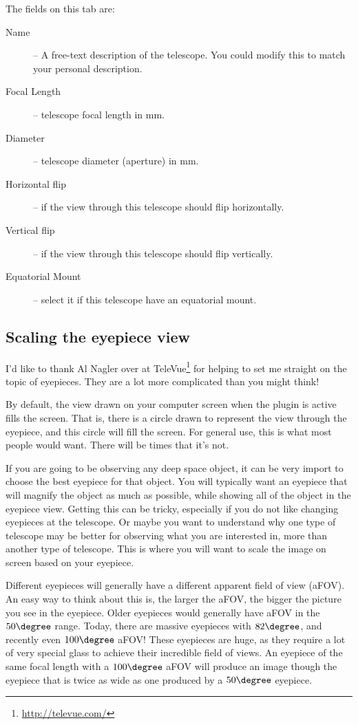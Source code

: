 The fields on this tab are:
\begin{description}
\item[Name] -- A free-text description of the telescope. You could modify this to match your personal description.
\item[Focal Length] -- telescope focal length in mm.
\item[Diameter] -- telescope diameter (aperture) in mm.
\item[Horizontal flip] -- if the view through this telescope should flip horizontally.
\item[Vertical flip] -- if the view through this telescope should flip vertically.
\item[Equatorial Mount] -- select it if this telescope have an equatorial mount.
\end{description}

\subsection{Scaling the eyepiece view}
\label{sec:sec:plugins:Oculars:ScalingTheEyepieceView}
I'd like to thank Al Nagler over at TeleVue\footnote{\url{http://televue.com/}} for helping to set me straight on the topic of eyepieces. They are a lot more complicated than you might think!

By default, the view drawn on your computer screen when the plugin is active fills the screen. That is, there is a circle drawn to represent the view through the eyepiece, and this circle will fill the screen. For general use, this is what most people would want. There will be times that it's not.

If you are going to be observing any deep space object, it can be very import to choose the best eyepiece for that object. You will typically want an eyepiece that will magnify the object as much as possible, while showing all of the object in the eyepiece view. Getting this can be tricky, especially if you do not like changing eyepieces at the telescope. Or maybe you want to understand why one type of telescope may be better for observing what you are interested in, more than another type of telescope. This is where you will want to scale the image on screen based on your eyepiece.

Different eyepieces will generally have a different apparent field of view (aFOV). An easy way to think about this is, the larger the aFOV, the bigger the picture you see in the eyepiece. Older eyepieces would generally have aFOV in the $50\degree$ range. Today, there are massive eyepieces with $82\degree$, and recently even $100\degree$ aFOV! These eyepieces are huge, as they require a lot of very special glass to achieve their incredible field of views. An eyepiece of the same focal length with a $100\degree$ aFOV will produce an image though the eyepiece that is twice as wide as one produced by a $50\degree$ eyepiece.

